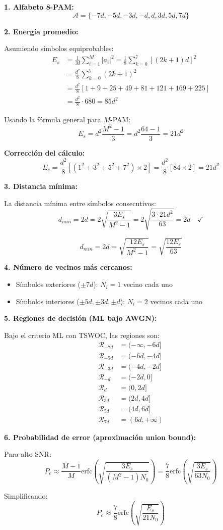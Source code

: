 \documentclass[10pt,a4paper]{article}
\begin{document}
\begin{solucion}
\textbf{1. Alfabeto 8-PAM:}
\[
\mathcal{A} = \{-7d, -5d, -3d, -d, d, 3d, 5d, 7d\}
\]

\textbf{2. Energía promedio:}

Asumiendo símbolos equiprobables:
\begin{align*}
E_s &= \frac{1}{M} \sum_{i=1}^{M} |a_i|^2 = \frac{1}{8} \sum_{k=0}^{7} [(2k+1)d]^2\\
&= \frac{d^2}{8} \sum_{k=0}^{7} (2k+1)^2\\
&= \frac{d^2}{8}[1 + 9 + 25 + 49 + 81 + 121 + 169 + 225]\\
&= \frac{d^2}{8} \cdot 680 = 85d^2
\end{align*}

Usando la fórmula general para $M$-PAM:
\[
\boxed{E_s = d^2 \frac{M^2 - 1}{3} = d^2 \frac{64 - 1}{3} = 21d^2}
\]

\textbf{Corrección del cálculo:}
\[
E_s = \frac{d^2}{8}[(1^2 + 3^2 + 5^2 + 7^2) \times 2] = \frac{d^2}{8}[84 \times 2] = 21d^2
\]

\textbf{3. Distancia mínima:}

La distancia mínima entre símbolos consecutivos:
\[
d_{min} = 2d = 2\sqrt{\frac{3E_s}{M^2-1}} = 2\sqrt{\frac{3 \cdot 21d^2}{63}} = 2d \quad \checkmark
\]

\[
\boxed{d_{min} = 2d = \sqrt{\frac{12E_s}{M^2-1}} = \sqrt{\frac{12E_s}{63}}}
\]

\textbf{4. Número de vecinos más cercanos:}

\begin{itemize}
\item Símbolos exteriores ($\pm 7d$): $N_i = 1$ vecino cada uno
\item Símbolos interiores ($\pm 5d, \pm 3d, \pm d$): $N_i = 2$ vecinos cada uno
\end{itemize}

\textbf{5. Regiones de decisión (ML bajo AWGN):}

Bajo el criterio ML con TSWOC, las regiones son:
\begin{align*}
\mathcal{R}_{-7d} &= (-\infty, -6d]\\
\mathcal{R}_{-5d} &= (-6d, -4d]\\
\mathcal{R}_{-3d} &= (-4d, -2d]\\
\mathcal{R}_{-d} &= (-2d, 0]\\
\mathcal{R}_{d} &= (0, 2d]\\
\mathcal{R}_{3d} &= (2d, 4d]\\
\mathcal{R}_{5d} &= (4d, 6d]\\
\mathcal{R}_{7d} &= (6d, +\infty)
\end{align*}

\textbf{6. Probabilidad de error (aproximación union bound):}

Para alto SNR:
\[
\boxed{P_e \approx \frac{M-1}{M} \text{erfc}\left(\sqrt{\frac{3E_s}{(M^2-1)N_0}}\right) = \frac{7}{8} \text{erfc}\left(\sqrt{\frac{3E_s}{63N_0}}\right)}
\]

Simplificando:
\[
\boxed{P_e \approx \frac{7}{8} \text{erfc}\left(\sqrt{\frac{E_s}{21N_0}}\right)}
\]
\end{solucion}
\end{document}
